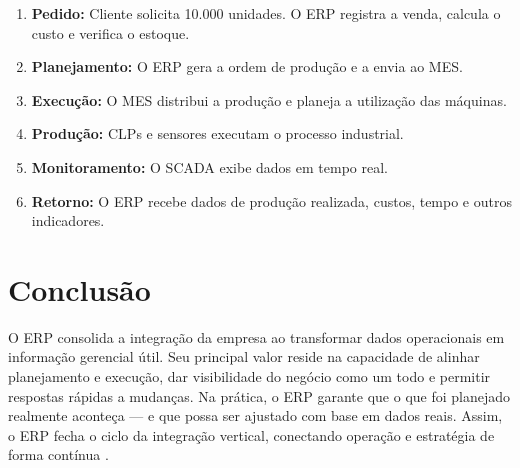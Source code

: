 \documentclass[12pt,a4paper,oneside]{article}
\begin{document}
\begin{enumerate}
  \item \textbf{Pedido:} Cliente solicita 10.000 unidades. O ERP registra a venda, calcula o custo e verifica o estoque.
  \item \textbf{Planejamento:} O ERP gera a ordem de produção e a envia ao MES.
  \item \textbf{Execução:} O MES distribui a produção e planeja a utilização das máquinas.
  \item \textbf{Produção:} CLPs e sensores executam o processo industrial.
  \item \textbf{Monitoramento:} O SCADA exibe dados em tempo real.
  \item \textbf{Retorno:} O ERP recebe dados de produção realizada, custos, tempo e outros indicadores.
\end{enumerate}

\section{Conclusão}

O ERP consolida a integração da empresa ao transformar dados operacionais em informação gerencial útil. Seu principal valor reside na capacidade de alinhar planejamento e execução, dar visibilidade do negócio como um todo e permitir respostas rápidas a mudanças. Na prática, o ERP garante que o que foi planejado realmente aconteça --- e que possa ser ajustado com base em dados reais. Assim, o ERP fecha o ciclo da integração vertical, conectando operação e estratégia de forma contínua \cite{schwab2016}.



\end{document}
